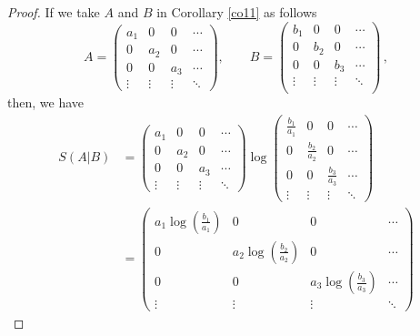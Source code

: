 \documentclass[12pt, reqno]{amsart}
\theoremstyle{definition}
\theoremstyle{remark}
\numberwithin{equation}{section}
\begin{document}
\begin{proof}\label{r1}
	If we take $A$ and $B$ in Corollary \ref{co11} as follows
	$$
	A=\begin{pmatrix}
	a_1  &     0    &     0    & \cdots \\
	0    &   a_2   &     0    & \cdots \\
	0    &     0     &   a_3  & \cdots\\
	\vdots & \vdots  & \vdots & \ddots
	\end{pmatrix},\quad\quad
	B=\begin{pmatrix}
	b_1  &     0    &     0    & \cdots \\
	0    &   b_2   &     0    & \cdots \\
	0    &     0     &   b_3  & \cdots\\
	\vdots & \vdots  & \vdots & \ddots\\
	\end{pmatrix}\,,
	$$
	then, we have
	\begin{align*}
    S(A|B)
	& = \begin{pmatrix}
	a_1  &     0    &     0    & \cdots \\
	0    &   a_2   &     0    & \cdots \\
	0    &     0     &   a_3  & \cdots\\
	\vdots & \vdots  & \vdots & \ddots
	\end{pmatrix}
	\log
	\begin{pmatrix}
	\frac{b_1}{a_1} &     0                   &     0                  & \cdots \\
	0              & \frac{b_2}{a_2} &     0                  & \cdots\\
	0                      &      0                 & \frac{b_3}{a_3} & \cdots\\
	\vdots               & \vdots               & \vdots                & \ddots
	\end{pmatrix}\\
	& = \begin{pmatrix}
	a_1\log\left(\frac{b_1}{a_1}\right) &                                 0                                  &                              0                     & \cdots \\
	0                                                    & a_2\log\left(\frac{b_2}{a_2}\right) &     0                  & \cdots\\
	0                        &     0       & a_3\log\left(\frac{b_3}{a_3}\right) &           \cdots\\
	\vdots               & \vdots               & \vdots                & \ddots

\end{pmatrix}
\end{align*}
\end{proof}
\end{document}
